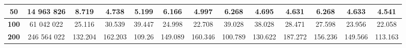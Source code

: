 \documentclass[12pt,letterpaper]{article}
\begin{document}
\begin{table}[H]
\begin{adjustbox}{max width=\textwidth, height= 1.6cm}
\begin{tabular}{|c|c|c|c|c|c|c|c|c|c|c|c|c|}
\textbf{50}                                                    & 14 963 826                                                               & 8.719                                                      & 4.738                                                      & 5.199                                                      & 6.166                                                      & 4.997                                                      & 6.268                                                      & 4.695                                                      & 4.631                                                      & 6.268                                                      & 4.633                                                       & 4.541                                                                                    \\ \hline
\textbf{100}                                                   & 61 042 022                                                               & 25.116                                                     & 30.539                                                     & 39.447                                                     & 24.998                                                     & 22.708                                                     & 39.028                                                     & 38.028                                                     & 28.471                                                     & 27.598                                                     & 23.956                                                      & 22.058                                                                                   \\ \hline
\textbf{200}                                                   & 246 564 022                                                              & 132.204                                                    & 162.203                                                    & 109.26                                                     & 149.089                                                    & 160.346                                                    & 100.789                                                    & 130.622                                                    & 187.272                                                    & 156.236                                                    & 149.566                                                     & 113.163                                                                                  \\ \hline

\end{tabular}
\end{adjustbox}
\end{table}
\end{document}

